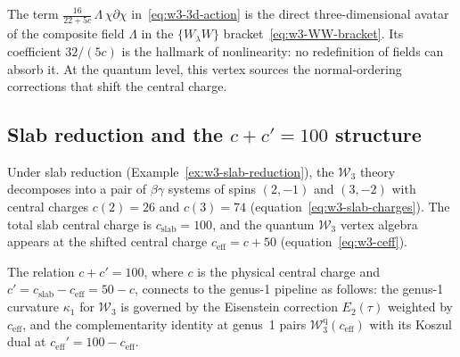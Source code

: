 \begin{remark}
\label{rem:w3-T2-vertex}
The term $\frac{16}{22+5c}\,\Lambda\,\chi\partial\chi$ in~\eqref{eq:w3-3d-action}
is the direct three-dimensional avatar of the composite field $\Lambda$ in
the $\{W_\lambda W\}$ bracket~\eqref{eq:w3-WW-bracket}.  Its
coefficient $32/(5c)$ is the hallmark of nonlinearity: no redefinition
of fields can absorb it.  At the quantum level, this vertex sources the
normal-ordering corrections that shift the central charge.
\end{remark}

\subsection{Slab reduction and the \texorpdfstring{$c + c' = 100$}{c + c' = 100} structure}

\begin{proposition}
\label{prop:w3-cc-arithmetic}
Under slab reduction (Example~\ref{ex:w3-slab-reduction}), the
$\mathcal{W}_3$ theory decomposes into a pair of $\beta\gamma$ systems
of spins $(2,-1)$ and $(3,-2)$ with central charges $c(2) = 26$ and
$c(3) = 74$ (equation~\eqref{eq:w3-slab-charges}).  The total slab
central charge is $c_{\mathrm{slab}} = 100$, and the quantum
$\mathcal{W}_3$ vertex algebra appears at the shifted central charge
$c_{\mathrm{eff}} = c + 50$ (equation~\eqref{eq:w3-ceff}).

The relation $c + c' = 100$, where $c$ is the physical central charge
and $c' = c_{\mathrm{slab}} - c_{\mathrm{eff}} = 50 - c$, connects to
the genus-1 pipeline as follows: the genus-1 curvature $\kappa_1$
for $\mathcal{W}_3$ is governed by the Eisenstein correction
$E_2(\tau)$ weighted by $c_{\mathrm{eff}}$, and the complementarity
identity at genus~1 pairs $\mathcal{W}_3^{\mathrm{q}}(c_{\mathrm{eff}})$
with its Koszul dual at $c_{\mathrm{eff}}' = 100 - c_{\mathrm{eff}}$.
\end{proposition}

